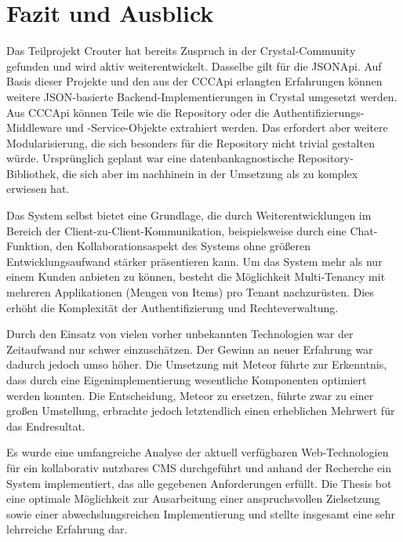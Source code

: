 \section{Fazit und Ausblick}
\label{sec:d_fazit_und_ausblick}

Das Teilprojekt Crouter hat bereits Zuspruch in der Crystal-Community gefunden
und wird aktiv weiterentwickelt.  Dasselbe gilt für die JSONApi.  Auf Basis
dieser Projekte und den aus der CCCApi erlangten Erfahrungen können weitere
JSON-basierte Backend-Implementierungen in Crystal umgesetzt werden.  Aus
CCCApi können Teile wie die Repository oder die Authentifizierungs-Middleware
und -Service-Objekte extrahiert werden.  Das erfordert aber weitere
Modularisierung, die sich besonders für die Repository nicht trivial gestalten
würde.  Ursprünglich geplant war eine datenbankagnostische
Repository-Bibliothek, die sich aber im nachhinein in der Umsetzung als zu
komplex erwiesen hat.

Das System selbst bietet eine Grundlage, die durch Weiterentwicklungen im
Bereich der Client-zu-Client-Kommunikation, beispielsweise durch eine
Chat-Funktion, den Kollaborationsaspekt des Systems ohne größeren
Entwicklungsaufwand stärker präsentieren kann.  Um das System mehr als nur
einem Kunden anbieten zu können, besteht die Möglichkeit Multi-Tenancy mit
mehreren Applikationen (Mengen von Items) pro Tenant nachzurüsten.  Dies erhöht
die Komplexität der Authentifizierung und Rechteverwaltung.

Durch den Einsatz von vielen vorher unbekannten Technologien war der
Zeitaufwand nur schwer einzuschätzen.  Der Gewinn an neuer Erfahrung war
dadurch jedoch umso höher.  Die Umsetzung mit Meteor führte zur Erkenntnis,
dass durch eine Eigenimplementierung wesentliche Komponenten optimiert werden
konnten.  Die Entscheidung, Meteor zu ersetzen, führte zwar zu einer großen
Umstellung, erbrachte jedoch letztendlich einen erheblichen Mehrwert für das
Endresultat.

Es wurde eine umfangreiche Analyse der aktuell verfügbaren Web-Technologien für
ein kollaborativ nutzbares CMS durchgeführt und anhand der Recherche ein System
implementiert, das alle gegebenen Anforderungen erfüllt.  Die Thesis bot eine
optimale Möglichkeit zur Ausarbeitung einer anspruchsvollen Zielsetzung sowie
einer abwechslungsreichen Implementierung und stellte insgesamt eine sehr
lehrreiche Erfahrung dar.
